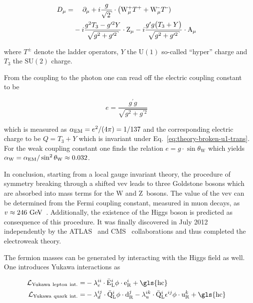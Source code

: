 \begin{align}
D_\mu=&~~~~\partial_\mu+i\frac{g}{\sqrt{2}}\cdot\big(\mathrm{W}^{\rmplus}_\mu T^{\rmplus}+\mathrm{W}^{\rmminus}_\mu T^{\rmminus})\nonumber\\
&-i\frac{g^2T_3-g^{\prime 2}Y}{\sqrt{g^2+g^{\prime 2}}}\cdot\mathrm{Z}_\mu-i\frac{g^{\prime}g\big(T_3+Y\big)}{\sqrt{g^2+g^{\prime 2}}}\cdot \mathrm{A}_\mu \label{eq:theory-codev-breaking}
\end{align}

where $T^{\pm}$ denote the ladder operators, $Y$ the $\mathrm{U(1)}$ so-called ``hyper'' charge and $T_3$ the $\mathrm{SU(2)}$ charge.

From the coupling to the photon one can read off the electric coupling constant to be 

\begin{equation}
e=\frac{g^{\prime} g}{\sqrt{g^2+g^{\prime 2}}}
\end{equation}

which is measured as ${\alpha_\mathrm{EM}}=e^2/(4\pi)=1/137$ and the corresponding electric charge to be $Q=T_3+Y$ which is invariant under Eq.~\ref{eq:theory-broken-u1-trans}. For the weak coupling constant one finds the relation $e=g\cdot\sin\theta_\mathrm{W}$ which yields ${\alpha_\mathrm{W}}={\alpha_\mathrm{EM}}/\sin^2\theta_\mathrm{W}\approx0.032$.

In conclusion, starting from a local gauge invariant theory, the procedure of symmetry breaking through a shifted \gls{vev} leads to three Goldstone bosons which are absorbed into mass terms for the $\mathrm{W}$ and $\mathrm{Z}$~bosons. The value of the \gls{vev} can be determined from the Fermi coupling constant, measured in muon decays, as $v\approx 246~\mathrm{GeV}$~\cite{PhysRevLett.106.041803}. Additionally, the existence of the Higgs boson is predicted as consequence of this procedure. It was finally discovered in July 2012 independently by the ATLAS~\cite{Aad:2012tfa} and CMS~\cite{Chatrchyan:2012xdj} collaborations and thus completed the electroweak theory.


The fermion masses can be generated by interacting with the Higgs field as well. One introduces Yukawa interactions as

\begin{align}
\mathcal{L}_\mathrm{Yukawa~lepton~int.}=&-\lambda_{e}^{ii}\cdot\bar{\mathrm{E}}^{i}_\mathrm{L}\phi\cdot\mathrm{e}^{i}_\mathrm{R}+\mathrm{\gls{hc}} \label{eq:theory-lepton-yukawa}\\
\mathcal{L}_\mathrm{Yukawa~quark~int.}=&-\lambda_{d}^{ij}\cdot\bar{\mathrm{Q}}^{i}_\mathrm{L}\phi\cdot\mathrm{d}^{j}_\mathrm{R}-\lambda_{u}^{ik}\cdot\bar{\mathrm{Q}}^{i}_\mathrm{L}\epsilon^{ij}\phi\cdot\mathrm{u}^{k}_\mathrm{R} +\mathrm{\gls{hc}} \label{eq:theory-quark-yukawa}
\end{align}


